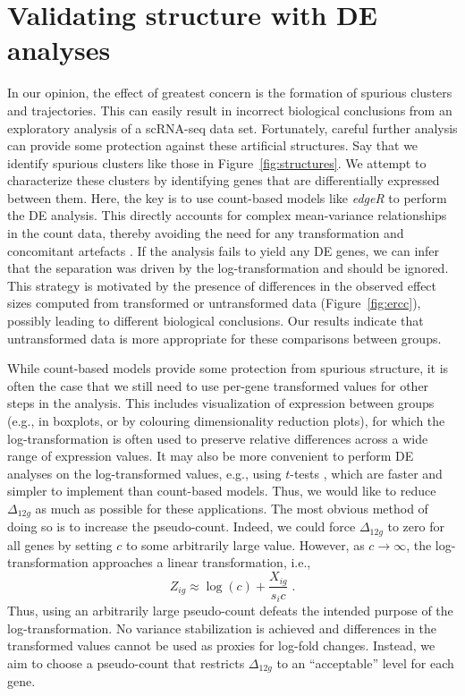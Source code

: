 \documentclass[10pt,letterpaper]{article}
\begin{document}
\section{Validating structure with DE analyses}
In our opinion, the effect of greatest concern is the formation of spurious clusters and trajectories.
This can easily result in incorrect biological conclusions from an exploratory analysis of a scRNA-seq data set.
Fortunately, careful further analysis can provide some protection against these artificial structures.
Say that we identify spurious clusters like those in Figure~\ref{fig:structures}.
We attempt to characterize these clusters by identifying genes that are differentially expressed between them.
Here, the key is to use count-based models like \textit{edgeR} \cite{robinson2010edgeR} to perform the DE analysis.
This directly accounts for complex mean-variance relationships in the count data, thereby avoiding the need for any transformation and concomitant artefacts \cite{ohara2010do}.
If the analysis fails to yield any DE genes, we can infer that the separation was driven by the log-transformation and should be ignored.
This strategy is motivated by the presence of differences in the observed effect sizes computed from transformed or untransformed data (Figure~\ref{fig:ercc}), possibly leading to different biological conclusions.
Our results indicate that untransformed data is more appropriate for these comparisons between groups.

While count-based models provide some protection from spurious structure, it is often the case that we still need to use per-gene transformed values for other steps in the analysis.
This includes visualization of expression between groups (e.g., in boxplots, or by colouring dimensionality reduction plots), for which the log-transformation is often used to preserve relative differences across a wide range of expression values.
It may also be more convenient to perform DE analyses on the log-transformed values, e.g., using $t$-tests \cite{law2014voom,soneson2018bias}, which are faster and simpler to implement than count-based models.
Thus, we would like to reduce $\Delta_{12g}$ as much as possible for these applications.
The most obvious method of doing so is to increase the pseudo-count.
Indeed, we could force $\Delta_{12g}$ to zero for all genes by setting $c$ to some arbitrarily large value.
However, as $c \to \infty$, the log-transformation approaches a linear transformation, i.e.,
\[
    Z_{ig} \approx \log(c) + \frac{X_{ig}}{s_i c} \;.
\]
Thus, using an arbitrarily large pseudo-count defeats the intended purpose of the log-transformation. 
No variance stabilization is achieved and differences in the transformed values cannot be used as proxies for log-fold changes. 
Instead, we aim to choose a pseudo-count that restricts $\Delta_{12g}$ to an ``acceptable'' level for each gene.
\end{document}
